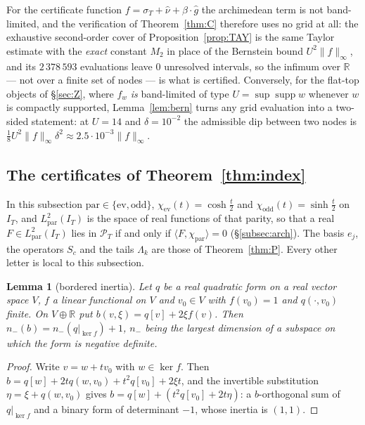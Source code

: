 \documentclass[11pt]{amsart}
\newtheorem{lemma}[theorem]{Lemma}
\theoremstyle{definition}
\theoremstyle{remark}
\newcommand{\R}{\mathbb R}
\newcommand{\supp}{\operatorname{supp}}
\newcommand{\PT}{\mathcal P_T}
\newcommand{\IT}{I_T}
\newcommand{\sT}{\sigma_T}
\newcommand{\nuh}{\widehat\nu}
\begin{document}
For the certificate function
$f=\sT+\nuh+\beta\cdot\widehat g$ the archimedean term is not band-limited, and the verification of
Theorem~\ref{thm:C} therefore uses no grid at all: the exhaustive second-order cover of
Proposition~\ref{prop:TAY} is the same Taylor estimate with the \emph{exact} constant $M_2$ in
place of the Bernstein bound $U^2\|f\|_\infty$, and its $2\,378\,593$ evaluations leave $0$
unresolved intervals, so the infimum over $\R$ --- not over a finite set of nodes --- is what is
certified. Conversely, for the flat-top objects of \S\ref{sec:Z}, where $f_w$ \emph{is}
band-limited of type $U=\sup\supp w$ whenever $w$ is compactly supported, Lemma~\ref{lem:bern}
turns any grid evaluation into a two-sided statement: at $U=14$ and $\delta=10^{-2}$ the admissible dip between two nodes is
$\frac18U^2\|f\|_\infty\delta^2\approx2.5\cdot10^{-3}\|f\|_\infty$.

\subsection{The certificates of Theorem~\ref{thm:index}}\label{subsec:enclindex}
In this subsection $\mathrm{par}\in\{\mathrm{ev},\mathrm{odd}\}$, $\chi_{\mathrm{ev}}(t)=\cosh\frac t2$ and
$\chi_{\mathrm{odd}}(t)=\sinh\frac t2$ on $\IT$, and $L^2_{\mathrm{par}}(\IT)$ is the space of real functions
of that parity, so that a real $F\in L^2_{\mathrm{par}}(\IT)$ lies in $\PT$ if and only if
$\langle F,\chi_{\mathrm{par}}\rangle=0$ (\S\ref{subsec:arch}). The basis $e_j$, the operators $S_c$ and the
tails $\Lambda_k$ are those of Theorem~\ref{thm:P}. Every other letter is local to this subsection.

\begin{lemma}[bordered inertia]\label{lem:border}
Let $q$ be a real quadratic form on a real vector space $V$, $f$ a linear functional on
$V$ and $v_0\in V$ with $f(v_0)=1$ and $q(\cdot,v_0)$ finite. On $V\oplus\R$ put
$b(v,\xi)=q[v]+2\xi f(v)$. Then $n_-(b)=n_-(q|_{\ker f})+1$, $n_-$ being the largest dimension of a
subspace on which the form is negative definite.
\end{lemma}
\begin{proof}
Write $v=w+tv_0$ with $w\in\ker f$. Then $b=q[w]+2tq(w,v_0)+t^2q[v_0]+2\xi t$, and the invertible
substitution $\eta=\xi+q(w,v_0)$ gives $b=q[w]+(t^2q[v_0]+2t\eta)$: a $b$-orthogonal sum of
$q|_{\ker f}$ and a binary form of determinant $-1$, whose inertia is $(1,1)$.
\end{proof}
\end{document}
